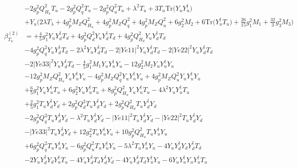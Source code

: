 \begin{align}
 &-2 g_{p}^{2} Q_{H_u}^{2} T_u -2 g_{p}^{2} Q_{q}^{2} T_u -2 g_{p}^{2} Q_{u}^{2} T_u +\lambda^{2} T_u +3 T_u \mbox{Tr}\Big({Y_u  Y_{u}^{\dagger}}\Big) \nonumber \\ 
 &+Y_u \Big(2 \lambda T_{\lambda}  + 4 g_{p}^{2} M_Z Q_{H_u}^{2}  + 4 g_{p}^{2} M_Z Q_{q}^{2}  + 4 g_{p}^{2} M_Z Q_{u}^{2}  + 6 g_{2}^{2} M_2  + 6 \mbox{Tr}\Big({Y_{u}^{\dagger}  T_u}\Big)  + \frac{26}{15} g_{1}^{2} M_1  + \frac{32}{3} g_{3}^{2} M_3 \Big)\\ 
\beta_{T_u}^{(2)} & =  
+\frac{4}{5} g_{1}^{2} {Y_u  Y_{d}^{\dagger}  T_d} +4 g_{p}^{2} Q_{d}^{2} {Y_u  Y_{d}^{\dagger}  T_d} +4 g_{p}^{2} Q_{H_d}^{2} {Y_u  Y_{d}^{\dagger}  T_d} \nonumber \\ 
 &-4 g_{p}^{2} Q_{q}^{2} {Y_u  Y_{d}^{\dagger}  T_d} -2 \lambda^{2} {Y_u  Y_{d}^{\dagger}  T_d} -2 |Ye11|^2 {Y_u  Y_{d}^{\dagger}  T_d} -2 |Ye22|^2 {Y_u  Y_{d}^{\dagger}  T_d} \nonumber \\ 
 &-2 |Ye33|^2 {Y_u  Y_{d}^{\dagger}  T_d} -\frac{4}{5} g_{1}^{2} M_1 {Y_u  Y_{u}^{\dagger}  Y_u} -12 g_{2}^{2} M_2 {Y_u  Y_{u}^{\dagger}  Y_u} \nonumber \\ 
 &-12 g_{p}^{2} M_Z Q_{H_u}^{2} {Y_u  Y_{u}^{\dagger}  Y_u} -4 g_{p}^{2} M_Z Q_{q}^{2} {Y_u  Y_{u}^{\dagger}  Y_u} +4 g_{p}^{2} M_Z Q_{u}^{2} {Y_u  Y_{u}^{\dagger}  Y_u} \nonumber \\ 
 &+\frac{6}{5} g_{1}^{2} {Y_u  Y_{u}^{\dagger}  T_u} +6 g_{2}^{2} {Y_u  Y_{u}^{\dagger}  T_u} +8 g_{p}^{2} Q_{H_u}^{2} {Y_u  Y_{u}^{\dagger}  T_u} -4 \lambda^{2} {Y_u  Y_{u}^{\dagger}  T_u} \nonumber \\ 
 &+\frac{2}{5} g_{1}^{2} {T_u  Y_{d}^{\dagger}  Y_d} +2 g_{p}^{2} Q_{d}^{2} {T_u  Y_{d}^{\dagger}  Y_d} +2 g_{p}^{2} Q_{H_d}^{2} {T_u  Y_{d}^{\dagger}  Y_d} \nonumber \\ 
 &-2 g_{p}^{2} Q_{q}^{2} {T_u  Y_{d}^{\dagger}  Y_d} - \lambda^{2} {T_u  Y_{d}^{\dagger}  Y_d} - |Ye11|^2 {T_u  Y_{d}^{\dagger}  Y_d} - |Ye22|^2 {T_u  Y_{d}^{\dagger}  Y_d} \nonumber \\ 
 &- |Ye33|^2 {T_u  Y_{d}^{\dagger}  Y_d} +12 g_{2}^{2} {T_u  Y_{u}^{\dagger}  Y_u} +10 g_{p}^{2} Q_{H_u}^{2} {T_u  Y_{u}^{\dagger}  Y_u} \nonumber \\ 
 &+6 g_{p}^{2} Q_{q}^{2} {T_u  Y_{u}^{\dagger}  Y_u} -6 g_{p}^{2} Q_{u}^{2} {T_u  Y_{u}^{\dagger}  Y_u} -5 \lambda^{2} {T_u  Y_{u}^{\dagger}  Y_u} -4 {Y_u  Y_{d}^{\dagger}  Y_d  Y_{d}^{\dagger}  T_d} \nonumber \\ 
 &-2 {Y_u  Y_{d}^{\dagger}  Y_d  Y_{u}^{\dagger}  T_u} -4 {Y_u  Y_{d}^{\dagger}  T_d  Y_{d}^{\dagger}  Y_d} -4 {Y_u  Y_{d}^{\dagger}  T_d  Y_{u}^{\dagger}  Y_u} -6 {Y_u  Y_{u}^{\dagger}  Y_u  Y_{u}^{\dagger}  T_u} \nonumber \\ 

\end{align}
